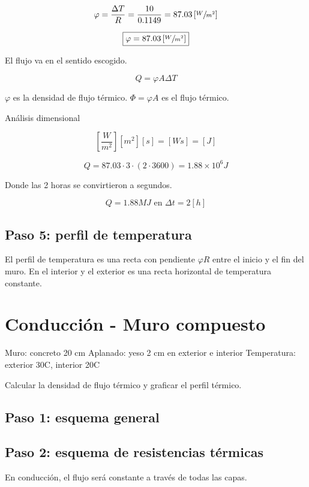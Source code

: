 \documentclass[12pt]{article}
\begin{document}
\[ \varphi = \frac{ \Delta T }{ R } = \frac{ 10 }{ 0.1149 } = 87.03 \left[ \sfrac{ W }{ m ^ 2 } \right] \]

\[ \boxed{ \varphi = 87.03 \left[ \sfrac{ W }{ m ^ 2 } \right] } \]

El flujo va en el sentido escogido.

\[ Q = \varphi A \Delta T \]

$ \varphi $ es la densidad de flujo térmico. $ \Phi = \varphi A $ es el flujo térmico.

Análisis dimensional

\[ \left[ \frac{ W }{ m ^ 2 } \right] \left[ m ^ 2 \right] \left[ s \right] = \left[ W s \right] = \left[ J \right] \]

\[ Q = 87.03 \cdot 3 \cdot \left( 2 \cdot 3600 \right) = 1.88 \times 10 ^ 6 J  \]

Donde las 2 horas se convirtieron a segundos.

\[ Q = 1.88 MJ \text{ en } \Delta t = 2 \left[ h \right] \]

\subsection{Paso 5: perfil de temperatura}

El perfil de temperatura es una recta con pendiente $ \varphi R $ entre el inicio y el fin del muro. En el interior y el exterior es una recta horizontal de temperatura constante.

\section{Conducción - Muro compuesto}

Muro: concreto 20 cm
Aplanado: yeso 2 cm en exterior e interior
Temperatura: exterior 30\degree C, interior 20\degree C

Calcular la densidad de flujo térmico y graficar el perfil térmico.

\subsection{Paso 1: esquema general}

\subsection{Paso 2: esquema de resistencias térmicas}

En conducción, el flujo será constante a través de todas las capas.
\end{document}

